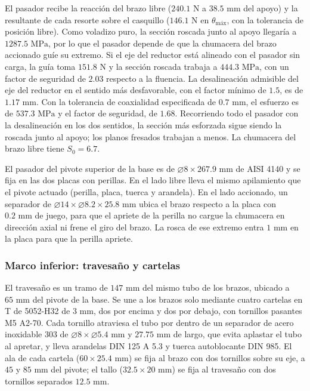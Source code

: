 \documentclass[../../General.tex]{subfiles}
\begin{document}
El pasador recibe la reacción del brazo libre ($240.1\text{ N}$ a $38.5\text{ mm}$ del apoyo) y la resultante de cada resorte sobre el casquillo ($146.1\text{ N}$ en $\theta_{\text{máx}}$, con la tolerancia de posición libre). Como voladizo puro, la sección roscada junto al apoyo llegaría a $1287.5\text{ MPa}$, por lo que el pasador depende de que la chumacera del brazo accionado guíe su extremo. Si el eje del reductor está alineado con el pasador sin carga, la guía toma $151.8\text{ N}$ y la sección roscada trabaja a $444.3\text{ MPa}$, con un factor de seguridad de $2.03$ respecto a la fluencia. La desalineación admisible del eje del reductor en el sentido más desfavorable, con el factor mínimo de $1.5$, es de $1.17\text{ mm}$. Con la tolerancia de coaxialidad especificada de $0.7\text{ mm}$, el esfuerzo es de $537.3\text{ MPa}$ y el factor de seguridad, de $1.68$. Recorriendo todo el pasador con la desalineación en los dos sentidos, la sección más esforzada sigue siendo la roscada junto al apoyo; los planos fresados trabajan a menos. La chumacera del brazo libre tiene $S_0 = 6.7$.

El pasador del pivote superior de la base es de $\varnothing 8 \times 267.9\text{ mm}$ de AISI 4140 y se fija en las dos placas con perillas. En el lado libre lleva el mismo apilamiento que el pivote actuado (perilla, placa, tuerca y arandela). En el lado accionado, un separador de $\varnothing 14 \times \varnothing 8.2 \times 25.8\text{ mm}$ ubica el brazo respecto a la placa con $0.2\text{ mm}$ de juego, para que el apriete de la perilla no cargue la chumacera en dirección axial ni frene el giro del brazo. La rosca de ese extremo entra $1\text{ mm}$ en la placa para que la perilla apriete.

\subsubsection{Marco inferior: travesaño y cartelas}

El travesaño es un tramo de $147\text{ mm}$ del mismo tubo de los brazos, ubicado a $65\text{ mm}$ del pivote de la base. Se une a los brazos solo mediante cuatro cartelas en T de 5052-H32 de $3\text{ mm}$, dos por encima y dos por debajo, con tornillos pasantes M5 A2-70. Cada tornillo atraviesa el tubo por dentro de un separador de acero inoxidable 303 de $\varnothing 8 \times \varnothing 5.4\text{ mm}$ y $27.75\text{ mm}$ de largo, que evita aplastar el tubo al apretar, y lleva arandelas DIN 125 A 5.3 y tuerca autoblocante DIN 985. El ala de cada cartela ($60 \times 25.4\text{ mm}$) se fija al brazo con dos tornillos sobre su eje, a $45$ y $85\text{ mm}$ del pivote; el tallo ($32.5 \times 20\text{ mm}$) se fija al travesaño con dos tornillos separados $12.5\text{ mm}$.
\end{document}
